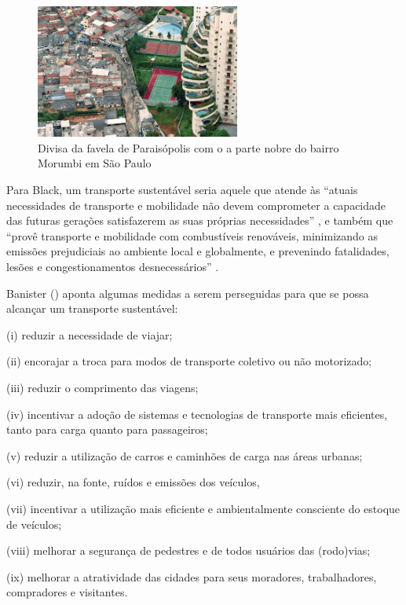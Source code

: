 \clearpage
\begin{figure}[htb]%
    \caption{\label{fig:paraisopolis-morumbi}Divisa da favela de Paraisópolis com o a parte nobre do bairro Morumbi em São Paulo}%
    \begin{center}%
        \includegraphics[width=0.60\textwidth]{./imagens/morumbiparaisopolis.jpg}%
    \end{center}%
\end{figure}%

Para Black, um transporte sustentável seria aquele que atende às ``atuais necessidades de transporte e mobilidade não devem comprometer a capacidade das futuras gerações satisfazerem as suas próprias necessidades'' \cite[p.151]{BLACK1996}, e também que ``provê transporte e mobilidade com combustíveis renováveis, minimizando as emissões prejudiciais ao ambiente local e globalmente, e prevenindo fatalidades, lesões e congestionamentos desnecessários'' \cite[p.12]{BLACK2010}.

Banister (\citeyear{BANISTER2005,BANISTER2008}) aponta algumas medidas a serem perseguidas para que se possa alcançar um transporte sustentável:
\begin{compactitem}[]
\item (i) reduzir a necessidade de viajar;
\item (ii) encorajar a troca para modos de transporte coletivo ou não motorizado;
\item (iii) reduzir o comprimento das viagens;
\item (iv) incentivar a adoção de sistemas e tecnologias de transporte mais eficientes, tanto para carga quanto para passageiros;
\item (v) reduzir a utilização de carros e caminhões de carga nas áreas urbanas;
\item (vi) reduzir, na fonte, ruídos e emissões dos veículos,
\item (vii) incentivar a utilização mais eficiente e ambientalmente consciente do estoque de veículos;
\item (viii) melhorar a segurança de pedestres e de todos usuários das (rodo)vias;
\item (ix) melhorar a atratividade das cidades para seus moradores, trabalhadores, compradores e visitantes.
\end{compactitem}



